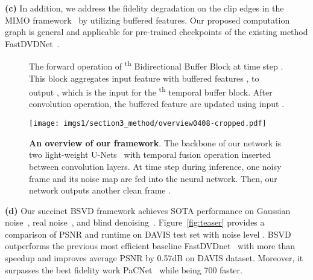 \documentclass[sigconf]{acmart}
\newcommand{\ts}{\textsuperscript}
\begin{document}
\textbf{(c)}
In addition, we address the fidelity degradation on the clip edges in the MIMO framework~\cite{chan2021basicvsr} by
utilizing buffered features.
Our proposed computation graph is general and applicable for pre-trained checkpoints of the existing method FastDVDNet~\cite{Tassano2020FastDVDNet}.
\begin{figure*}[t]
\centering
{}

\caption{The forward operation of \ts{th} Bidirectional Buffer Block at time step . This block aggregates input feature  with buffered features , to output , which is the input for the \ts{th} temporal buffer block. After convolution operation, the buffered feature are updated using input .}

\label{fig:Bidirectional Buffer Block}
\end{figure*}
\begin{figure*}[t]
\centering
\texttt{[image: imgs1/section3\_method/overview0408-cropped.pdf]}
\caption{ \textbf{An overview of our framework}. The backbone of our network is two light-weight U-Nets~\cite{Ronneberger2015U-Net} with temporal fusion operation inserted between convolution layers. At time step  during inference, one noisy frame  and its noise map are fed into the neural network. Then, our network outputs another clean frame .}
\label{fig:overview}
\end{figure*}

\textbf{(d)} Our succinct BSVD framework 
achieves SOTA performance on Gaussian noise~\cite{Tassano2020FastDVDNet,Vaksman2021Patch}, real noise~\cite{Maggioni2021Efficient}, and blind denoising~\cite{Sheth2021UDVD,Xiang2022ReMoNet}. Figure~\ref{fig:teaser} provides a comparison of PSNR and runtime on DAVIS test set with noise level . BSVD outperforms the previous most efficient baseline FastDVDnet~\cite{Tassano2020FastDVDNet} 
with more than  speedup and improves average PSNR by 0.57dB on DAVIS dataset. Moreover, it surpasses the best fidelity work PaCNet~\cite{Vaksman2021Patch} while being 700 faster.
\end{document}
